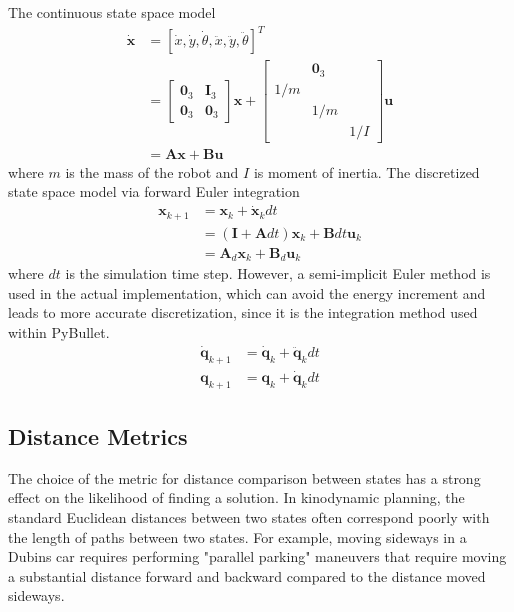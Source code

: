 \documentclass[11pt, conference]{IEEEtran}
\begin{document}
The continuous state space model
\begin{align*}
    \dot{\mathbf{x}}
    &= [\dot x, \dot y, \dot \theta, \ddot x, \ddot y, \ddot \theta]^T\\
    &= 
    \begin{bmatrix}
            \mathbf{0}_3 & \mathbf{I}_{3}\\
            \mathbf{0}_3 & \mathbf{0}_3
    \end{bmatrix}
    \mathbf{x} + 
    \begin{bmatrix}
        &\mathbf{0}_3& \\ 1/m&&\\ & 1/m&\\& & 1/I
    \end{bmatrix}
    \mathbf{u}\\
    &= \mathbf{A}\mathbf{x} + \mathbf{B}\mathbf{u}
\end{align*}
where $m$ is the mass of the robot and $I$ is moment of inertia.
The discretized state space model via forward Euler integration
\begin{align*}
    \mathbf{x}_{k+1} 
    &= \mathbf{x}_k + \dot{\mathbf{x}}_k dt\\
    &= (\mathbf{I} + \mathbf{A}dt)\mathbf{x}_k + \mathbf{B}dt\mathbf{u}_k\\
    &= \mathbf{A}_d \mathbf{x}_k + \mathbf{B}_d \mathbf{u}_k
\end{align*}
where $dt$ is the simulation time step.
However, a semi-implicit Euler method is used in the actual implementation, which can avoid the energy increment and leads to more accurate discretization, since it is the integration method used within PyBullet.
\begin{align*}
    \dot{\mathbf{q}}_{k+1} &= \dot{\mathbf{q}}_k + \ddot{\mathbf{q}}_kdt\\
    {\mathbf{q}}_{k+1} &= {\mathbf{q}}_k + \dot{\mathbf{q}}_kdt
\end{align*}

\subsection{Distance Metrics}

The choice of the metric for distance comparison between states has a strong effect on the likelihood of finding a solution. In kinodynamic planning, the standard Euclidean distances between two states often correspond poorly with the length of paths between two states. For example, moving sideways in a Dubins car requires performing "parallel parking" maneuvers that require moving a substantial distance forward and backward compared to the distance moved sideways\cite{hauser2020robotic}.
\end{document}
